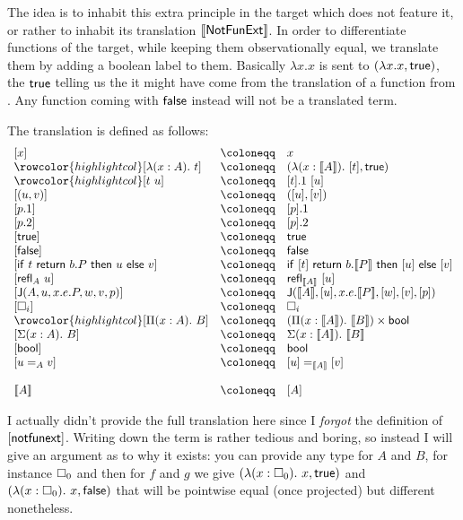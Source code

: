 The idea is to inhabit this extra principle in the target which does not feature
it, or rather to inhabit its translation \(\llbracket \mathsf{NotFunExt} \rrbracket\).
In order to differentiate functions of the target, while keeping them
observationally equal, we translate them by adding a boolean label to them.
Basically \(\lambda x. x\) is sent to \((\lambda x. x, \mathsf{true})\), the \(\mathsf{true}\)
telling us the it might have come from the translation of a function from \cS.
Any function coming with \(\mathsf{false}\) instead will not be a translated term.

The translation is defined as follows:
%
\[
\begin{array}{lcl}
  [ x ] &\coloneqq& x \\
  \rowcolor{highlightcol} \relax
  [ \lambda (x : A).\ t ] &\coloneqq& (\lambda (x : \transl{A}).\ [t],\ttrue) \\
  \rowcolor{highlightcol} \relax
  [ t\ u ] &\coloneqq& [t].1\ [u] \\ \relax
  [ (u, v) ] &\coloneqq& ([u], [v]) \\ \relax
  [ p.1 ] &\coloneqq& [p].1 \\ \relax
  [ p.2 ] &\coloneqq& [p].2 \\ \relax
  [ \ttrue ] &\coloneqq& \ttrue \\ \relax
  [ \ffalse ] &\coloneqq& \ffalse \\ \relax
  [ \tif{t}{b. P}{u}{v} ] &\coloneqq& \tif{[t]}{b. \transl{P}}{[u]}{[v]} \\
  \relax
  [ \refl{A} u ] &\coloneqq& \refl{\transl{A}} [u] \\ \relax
  [ \J{A}{u}{x.e.P}{w}{v}{p} ] &\coloneqq&
  \J{\transl{A}}{[u]}{x.e.\transl{P}}{[w]}{[v]}{[p]} \\ \relax
  [ \Ty{i} ] &\coloneqq& \Ty{i} \\
  \rowcolor{highlightcol} \relax
  [ \Pi (x : A).\ B ] &\coloneqq&
  (\Pi (x : \transl{A}).\ \transl{B}) \times \bool \\ \relax
  [ \Sigma (x : A).\ B ] &\coloneqq& \Sigma (x:\transl{A}).\ \transl{B} \\
  \relax
  [ \bool ] &\coloneqq& \bool \\ \relax
  [ u =_A v ] &\coloneqq& [u] =_{\transl{A}} [v] \\ \relax
  \\
  \transl{A} &\coloneqq& [A]
\end{array}
\]

I actually didn't provide the full translation here since I \emph{forgot}
the definition of \([\mathsf{notfunext}]\).
Writing down the term is rather tedious and boring, so instead I will give an
argument as to why it exists: you can provide any type for \(A\) and \(B\), for
instance \(\square_{0}\) and then for \(f\) and \(g\) we give
\((\lambda (x:\square_{0}).\ x, \mathsf{true})\) and
\((\lambda (x:\square_{0}).\ x, \mathsf{false})\) that will be pointwise equal (once
projected) but different nonetheless.


